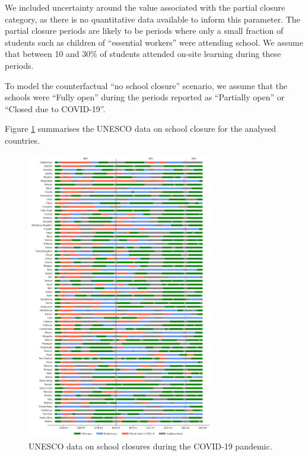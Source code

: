 We included uncertainty around the value associated with the partial closure category, as there is no quantitative data available to 
inform this parameter. The partial closure periods are likely to be periods where only a small fraction of students such as children of ``essential workers'' were 
attending school. We assume that between 10 and 30\% of students attended on-site learning during these periods.

To model the counterfactual ``no school closure'' scenario, we assume that the schools were ``Fully open'' during the
periods reported as ``Partially open'' or ``Closed due to COVID-19''.

Figure \ref{fig:unesco} summarises the UNESCO data on school closure for the analysed countries.

\begin{figure}[p]
  \begin{center}
  \includegraphics[width=0.73\textwidth]{../../tex_descriptions/projects/sm_covid/school_closures/unesco.png}
  \end{center}
  \caption{UNESCO data on school closures during the COVID-19 pandemic.
  } 
  \label{fig:unesco}
\end{figure}

